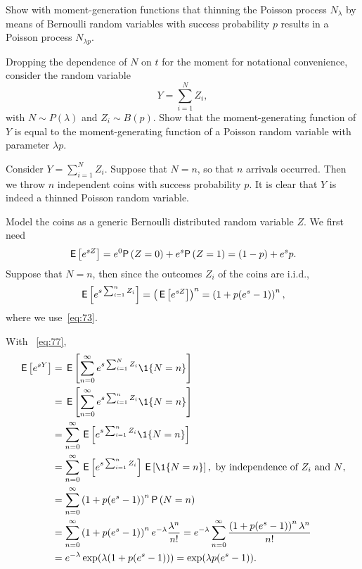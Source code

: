 \begin{exercise}\label{ex:1}
  Show with moment-generation functions that thinning the Poisson process $N_\lambda$ by means of Bernoulli random variables with success probability $p$ results in a Poisson process $N_{\lambda p}$.
\begin{hint}
Dropping the dependence of $N$ on $t$ for the moment for notational convenience,  consider the random variable 
  \begin{equation*}
    Y = \sum_{i=1}^N Z_i,
  \end{equation*}
  with $N\sim P(\lambda)$ and $Z_i\sim B(p)$. Show that the moment-generating function of $Y$ is equal to the moment-generating
  function of a Poisson random variable with parameter $\lambda p$.
\end{hint}
\begin{solution}
Consider $Y=\sum_{i=1}^N Z_i$. Suppose that $N=n$, so that $n$
arrivals occurred. Then we throw $n$ independent coins with success probability
$p$. It is clear that $Y$ is indeed a thinned Poisson random variable.

Model the coins as a generic Bernoulli distributed random variable
$Z$.  We first need
\begin{equation*}
  \E{e^{s Z}} = e^0 \P{Z=0} + e^{s} \P{Z=1} = (1-p) + e^s p.
\end{equation*}
Suppose that $N=n$, then since the outcomes $Z_i$ of the coins are i.i.d.,
\begin{equation*}
\,\mathsf{E}\left[e^{s\sum_{i=1}^n Z_i}\right] = \left(\,\mathsf{E}\left[e^{s Z}\right]\right)^n = \left(1 + p (e^s - 1)\right)^n,
\end{equation*}
where we use~\cref{eq:73}. 

With ~\cref{eq:77}, 
\begin{align*}
  \E{e^{s Y}}
&= \E{\sum_{n=0}^\infty e^{s\sum_{i=1}^N Z_i} \1{N=n}} \\
&= \E{\sum_{n=0}^\infty e^{s\sum_{i=1}^n Z_i} \1{N=n}} \\
&= \sum_{n=0}^\infty \E{e^{s\sum_{i=1}^n Z_i} \1{N=n}} \\
&= \sum_{n=0}^\infty \E{e^{s\sum_{i=1}^n Z_i}} \E{\1{N=n}}, \text{ by independence of $Z_i$ and $N$}, \\
&= \sum_{n=0}^\infty \left(1+p(e^s-1)\right)^n \P{N=n} \\
&= \sum_{n=0}^\infty \left(1+p(e^s-1)\right)^n e^{-\lambda} \frac{\lambda^n}{n!}
= e^{-\lambda} \sum_{n=0}^\infty \frac{\left(1+p(e^s-1)\right)^n \lambda^n}{n!}\\
&= e^{-\lambda} \exp(\lambda (1+p(e^s-1))) = \exp(\lambda p (e^s - 1)).
\end{align*}
\end{solution}
\end{exercise}    

